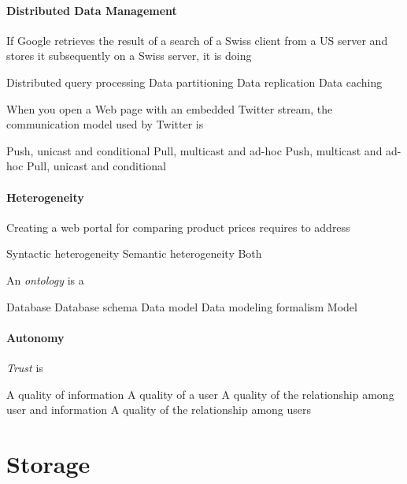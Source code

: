 \documentclass[12pt,a4paper,answers]{exam} %
\begin{document}
\begin{flushleft}
\begin{multicols*}{2}
\begin{questions}
\subsection{Distributed Data Management}

\question If Google retrieves the result of a search of a Swiss client from a US server and stores it subsequently on a Swiss server, it is doing
\begin{checkboxes}
\choice Distributed query processing
\chocie Data partitioning
\choice Data replication
\CorrectChoice Data caching
\end{checkboxes}

\question When you open a Web page with an embedded Twitter stream, the communication model used by Twitter is
\begin{checkboxes}
\CorrectChoice Push, unicast and conditional
\choice Pull, multicast and ad-hoc
\choice Push, multicast and ad-hoc
\choice Pull, unicast and conditional
\end{checkboxes}


\subsection{Heterogeneity}

\question Creating a web portal for comparing product prices requires to address
\begin{checkboxes}
\choice Syntactic heterogeneity
\choice Semantic heterogeneity
\CorrectChoice Both
\end{checkboxes}

\question An \emph{ontology} is a
\begin{checkboxes}
\choice Database
\choice Database schema
\choice Data model
\choice Data modeling formalism
\CorrectChoice Model
\end{checkboxes}


\subsection{Autonomy}

\question \emph{Trust} is
\begin{checkboxes}
\choice A quality of information
\choice A quality of a user
\choice A quality of the relationship among user and information
\choice A quality of the relationship among users
\end{checkboxes}



\part{Storage}

\end{questions}
\end{multicols*}
\end{flushleft}
\end{document}
